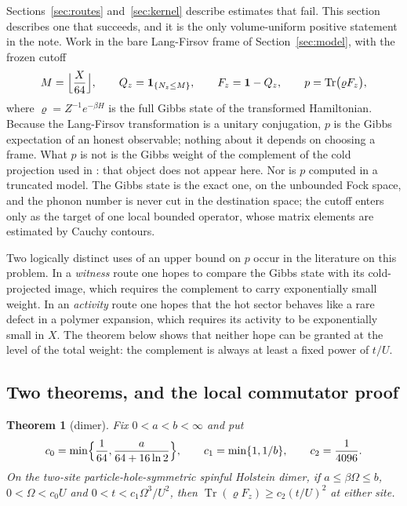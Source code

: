 \documentclass[11pt]{article}
\newtheorem{theorem}{Theorem}[section]
\theoremstyle{definition}
\theoremstyle{remark}
\begin{document}
Sections~\ref{sec:routes} and~\ref{sec:kernel} describe estimates that fail. This
section describes one that succeeds, and it is the only volume-uniform positive
statement in the note. Work in the bare Lang-Firsov frame of
Section~\ref{sec:model}, with the frozen cutoff
\begin{equation}
M=\Bigl\lfloor\frac{X}{64}\Bigr\rfloor,\qquad
Q_{z}=\mathbf{1}_{\{N_{z}\le M\}},\qquad F_{z}=\mathbf{1}-Q_{z},
\qquad p=\operatorname{Tr}\bigl(\varrho F_{z}\bigr),
\label{eq:Fz}
\end{equation}
where $\varrho=Z^{-1}e^{-\beta H}$ is the full Gibbs state of the transformed
Hamiltonian. Because the Lang-Firsov transformation is a unitary conjugation, $p$
is the Gibbs expectation of an honest observable; nothing about it depends on
choosing a frame. What $p$ is not is the Gibbs weight of the complement of the
cold projection used in \cite{largeu}: that object does not appear here. Nor is
$p$ computed in a truncated model. The Gibbs state is the exact one, on the
unbounded Fock space, and the phonon number is never cut in the destination
space; the cutoff enters only as the target of one local bounded operator, whose
matrix elements are estimated by Cauchy contours.

Two logically distinct uses of an upper bound on $p$ occur in the literature on
this problem. In a \emph{witness} route one hopes to compare the Gibbs state with
its cold-projected image, which requires the complement to carry exponentially
small weight. In an \emph{activity} route one hopes that the hot sector behaves
like a rare defect in a polymer expansion, which requires its activity to be
exponentially small in $X$. The theorem below shows that neither hope can be
granted at the level of the total weight: the complement is always at least a
fixed power of $t/U$.

\subsection{Two theorems, and the local commutator proof}

\begin{theorem}[dimer]\label{thm:vtailD}
Fix $0<a<b<\infty$ and put
\[
c_{0}=\min\Bigl\{\frac1{64},\frac{a}{64+16\ln2}\Bigr\},\qquad
c_{1}=\min\{1,1/b\},\qquad c_{2}=\frac1{4096}.
\]
On the two-site particle-hole-symmetric spinful Holstein dimer, if
$a\le\beta\Omega\le b$, $0<\Omega<c_{0}U$ and $0<t<c_{1}\Omega^{3}/U^{2}$, then
$\operatorname{Tr}(\varrho F_{z})\ge c_{2}(t/U)^{2}$ at either site.
\end{theorem}
\end{document}
